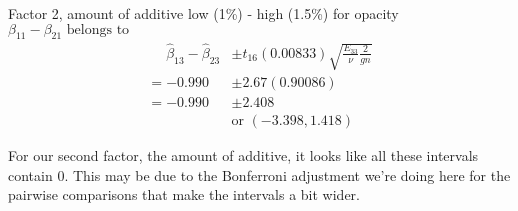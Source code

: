 \begin{enumerate}[label= (\alph*)]
    Factor 2, amount of additive low (1\%) - high (1.5\%) for opacity \newline
    $\beta_{11} - \beta_{21}\text{ belongs to}$
    \begin{align*}
        \phantom{=}
        \hat{\beta}_{13} - \hat{\beta}_{23}
        & \pm
        t_{16}(0.00833)
        \sqrt{\frac{E_{33}}{\nu}\frac{2}{gn}}
        \\
        =
        -0.990
        & \pm
        2.67(0.90086)
        \\
        =
        -0.990
        & \pm
        2.408
        \\
        \phantom{\pm 0.590}
        &
        \text{or }
        (-3.398, 1.418)
    \end{align*}

    For our second factor, the amount of additive, it looks like all these intervals contain 0. This may be due to the Bonferroni adjustment we're doing here for the pairwise comparisons that make the intervals a bit wider.


\end{enumerate}